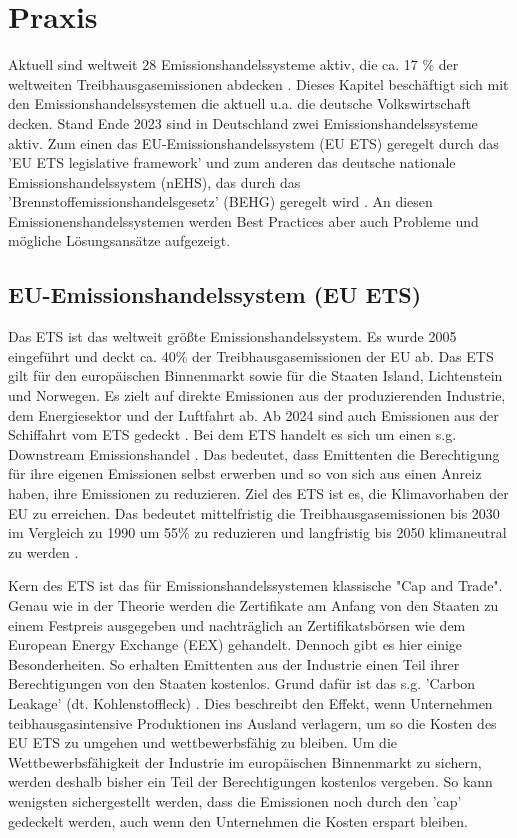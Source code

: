 \chapter{Praxis}

Aktuell sind weltweit 28 Emissionshandelssysteme aktiv, die ca. 17 \% der weltweiten Treibhausgasemissionen abdecken \cite[S. 7]{icap.2023}. 
Dieses Kapitel beschäftigt sich mit den Emissionshandelssystemen die aktuell u.a. die deutsche Volkswirtschaft decken. 
Stand Ende 2023 sind in Deutschland zwei Emissionshandelssysteme aktiv. 
Zum einen das EU-Emissionshandelssystem (EU ETS) geregelt durch das 'EU ETS legislative framework' \cite{eu.2023} und zum anderen das deutsche nationale Emissionshandelssystem (nEHS), das durch das 'Brennstoffemissionshandelsgesetz' (BEHG) geregelt wird \cite{dehst.2023}.
An diesen Emissionenshandelssystemen werden Best Practices aber auch Probleme und mögliche Lösungsansätze aufgezeigt.

\section{EU-Emissionshandelssystem (EU ETS)}

Das ETS ist das weltweit größte Emissionshandelssystem. Es wurde 2005 eingeführt und deckt ca. 40\% der Treibhausgasemissionen der EU ab. Das ETS gilt für den europäischen Binnenmarkt sowie für die Staaten Island, Lichtenstein und Norwegen. 
Es zielt auf direkte Emissionen aus der produzierenden Industrie, dem Energiesektor und der Luftfahrt ab. Ab 2024 sind auch Emissionen aus der Schiffahrt vom ETS gedeckt \cite{eu.2023}.
Bei dem ETS handelt es sich um einen s.g. Downstream Emissionshandel \cite{dehst.2023}. 
Das bedeutet, dass Emittenten die Berechtigung für ihre eigenen Emissionen selbst erwerben und so von sich aus einen Anreiz haben, ihre Emissionen zu reduzieren. Ziel des ETS ist es, die Klimavorhaben der EU zu erreichen. 
Das bedeutet mittelfristig die Treibhausgasemissionen bis 2030 im Vergleich zu 1990 um 55\% zu reduzieren und langfristig bis 2050 klimaneutral zu werden \cite{eu.2023}. 

Kern des ETS ist das für Emissionshandelssystemen klassische "Cap and Trade". Genau wie in der Theorie werden die Zertifikate am Anfang von den Staaten zu einem Festpreis ausgegeben und nachträglich an Zertifikatsbörsen wie dem European Energy Exchange (EEX) gehandelt. 
Dennoch gibt es hier einige Besonderheiten. So erhalten Emittenten aus der Industrie einen Teil ihrer Berechtigungen von den Staaten kostenlos. 
Grund dafür ist das s.g. 'Carbon Leakage' (dt. Kohlenstoffleck) \cite{eu2.2023}.
Dies beschreibt den Effekt, wenn Unternehmen teibhausgasintensive Produktionen ins Ausland verlagern, um so die Kosten des EU ETS zu umgehen und wettbewerbsfähig zu bleiben. 
Um die Wettbewerbsfähigkeit der Industrie im europäischen Binnenmarkt zu sichern, werden deshalb bisher ein Teil der Berechtigungen kostenlos vergeben. 
So kann wenigsten sichergestellt werden, dass die Emissionen noch durch den 'cap' gedeckelt werden, auch wenn den Unternehmen die Kosten erspart bleiben.

